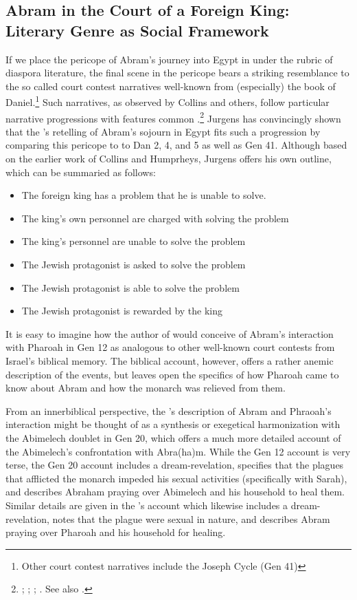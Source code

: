 \subsection{Abram in the Court of a Foreign King: Literary Genre as Social Framework}

If we place the pericope of Abram's journey into Egypt in \ga under the rubric of diaspora literature, the final scene in the pericope bears a striking resemblance to the so called court contest narratives well-known from (especially) the book of Daniel.\footnote{Other court contest narratives include the Joseph Cycle (Gen 41)} Such narratives, as observed by Collins and others, follow particular narrative progressions with features common .\footnote{\cite[TODO: pages]{collins1993}; \cite{humphreys_jbl1973}; \cite{collins_jbl1975}; \cite{wills1990}. See also \cite{niditch-doran_jbl1977}.} Jurgens has convincingly shown that the \ga's retelling of Abram's sojourn in Egypt fits such a progression by comparing this pericope to to Dan 2, 4, and 5 as well as Gen 41. Although based on the earlier work of Collins and Humprheys, Jurgens offers his own outline, which can be summaried as follows\autocite[21]{jurgens_jsj2018}:

\begin{itemize}
    \item The foreign king has a problem that he is unable to solve.
    \item The king's own personnel are charged with solving the problem
    \item The king's personnel are unable to solve the problem
    \item The Jewish protagonist is asked to solve the problem
    \item The Jewish protagonist is able to solve the problem
    \item The Jewish protagonist is rewarded by the king
\end{itemize}

It is easy to imagine how the author of \ga would conceive of Abram's interaction with Pharoah in Gen 12 as analogous to other well-known court contests from Israel's biblical memory. The biblical account, however, offers a rather anemic description of the events, but leaves open the specifics of how Pharoah came to know about Abram and how the monarch was relieved from them. 

From an innerbiblical perspective, the \ga's description of Abram and Phraoah's interaction might be thought of as a synthesis or exegetical harmonization with the Abimelech doublet in Gen 20, which offers a much more detailed account of the Abimelech's confrontation with Abra(ha)m. While the Gen 12 account is very terse, the Gen 20 account includes a dream-revelation, specifies that the plagues that afflicted the monarch impeded his sexual activities (specifically with Sarah), and describes Abraham praying over Abimelech and his household to heal them. Similar details are given in the \ga's account which likewise includes a dream-revelation, notes that the plague were sexual in nature, and describes Abram praying over Pharoah and his household for healing. 

